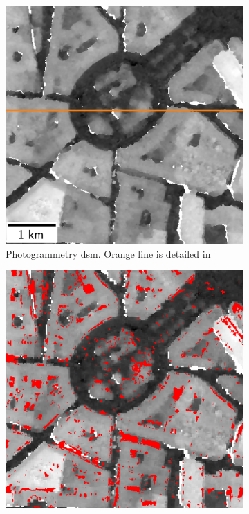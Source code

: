 \begin{figure}
    \begin{subfigure}[t]{0.49\linewidth}
        \flushleft
        \includegraphics[width=\linewidth]{Images/Chap_6/Toulouse_dsm_zoom.png}
        \caption{Photogrammetry \acrshort{dsm}. Orange line is detailed in }
        \label{fig:toulouse_dsm_zoom}
    \end{subfigure}\hfill
    \begin{subfigure}[t]{0.49\linewidth}
        \flushright
        \includegraphics[width=\linewidth]{Images/Chap_6/Toulouse_error_zoom.png}

\end{subfigure}
\end{figure}
